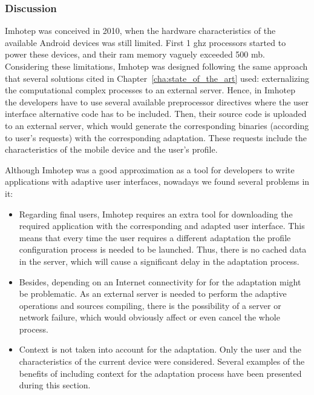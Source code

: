 \subsubsection{Discussion}
\label{sec:imhotep_discussion}

Imhotep was conceived in 2010, when the hardware characteristics of the 
available Android devices was still limited. First 1 \ac{ghz} processors started to 
power these devices, and their \ac{ram} memory vaguely exceeded 500 \ac{mb}. Considering 
these limitations, Imhotep was designed following the same approach that 
several solutions cited in Chapter~\ref{cha:state_of_the_art} used: 
externalizing the computational complex processes to an external server. Hence, 
in Imhotep the developers have to use several available preprocessor directives 
where the user interface alternative code has to be included. Then, their 
source code is uploaded to an external server, which would generate the 
corresponding binaries (according to user's requests) with the 
corresponding adaptation. These requests include the characteristics of the 
mobile device and the user's profile. 

Although Imhotep was a good approximation as a tool for developers to write 
applications with adaptive user interfaces, nowadays we found several problems
in it:

\begin{itemize}
  \item Regarding final users, Imhotep requires an extra tool for downloading 
  the required application with the corresponding and adapted user interface. 
  This means that every time the user requires a different adaptation the 
  profile configuration process is needed to be launched. Thus, there is no 
  cached data in the server, which will cause a significant delay in the 
  adaptation process.
  
  \item Besides, depending on an Internet connectivity for for the adaptation 
  might be problematic. As an external server is needed to perform the adaptive 
  operations and sources compiling, there is the possibility of a server or 
  network failure, which would obviously affect or even cancel the whole 
  process.
  
  \item Context is not taken into account for the adaptation. Only the user 
  and the characteristics of the current device were considered. Several 
  examples of the benefits of including context for the adaptation process have
  been presented during this section.
\end{itemize}

